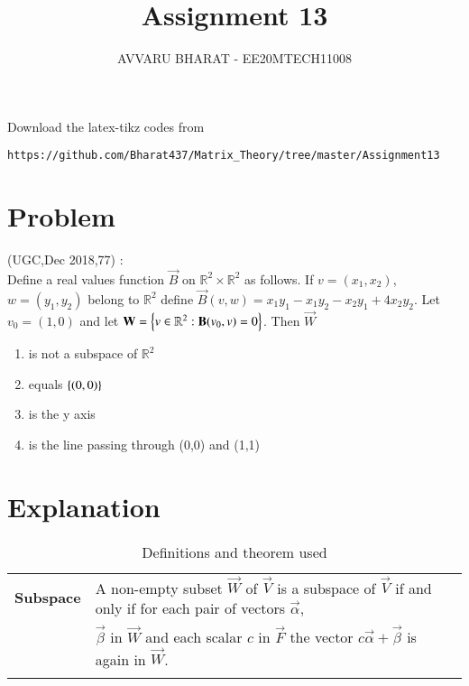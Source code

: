 \documentclass[journal,12pt]{IEEEtran}
\begin{document}
     \def\rightbox#1{\makebox[0in][r]{#1}}
     \def\centbox#1{\makebox[0in]{#1}}
     \def\topbox#1{\raisebox{-\baselineskip}[0in][0in]{#1}}
     \def\midbox#1{\raisebox{-0.5\baselineskip}[0in][0in]{#1}}
\vspace{3cm}
\title{Assignment 13}
\author{AVVARU BHARAT - EE20MTECH11008}
\maketitle
\bigskip
\renewcommand{\thefigure}{\theenumi}
\renewcommand{\thetable}{\theenumi}
%
Download the latex-tikz codes from 
%
\begin{lstlisting}
https://github.com/Bharat437/Matrix_Theory/tree/master/Assignment13
\end{lstlisting}
\section{\textbf{Problem}}
(UGC,Dec 2018,77) : \\
%
Define a real values function $\vec{B}$ on $\mathbb{R}^2\times\mathbb{R}^2$ as follows. If $v=(x_1,x_2)$, $w=(y_1,y_2)$ belong to $\mathbb{R}^2$ define $\vec{B}(v,w)=x_1y_1-x_1y_2-x_2y_1+4x_2y_2$. Let $v_0=(1,0)$ and let $\mathbf{W}=\left\{v\in\mathbb{R}^2:\mathbf{B}(v_0,v)=0\right\}$. Then $\vec{W}$
\begin{enumerate}
    \item is not a subspace of $\mathbb{R}^2$
    \item equals $\left\{(0,0)\right\}$
    \item is the y axis
    \item is the line passing through (0,0) and (1,1)
\end{enumerate}
\section{\textbf{Explanation}}
\renewcommand{\thetable}{1}
\begin{longtable}{|l|l|}
\hline
\endhead
\textbf{Subspace}&A non-empty subset $\vec{W}$ of $\vec{V}$ is a subspace of $\vec{V}$ if and only if for each pair of vectors $\vec{\alpha}$,\\& $\vec{\beta}$ in $\vec{W}$ and each scalar $c$ in $\vec{F}$ the vector $c\vec{\alpha}+\vec{\beta}$ is again in $\vec{W}$.\\
\hline
\caption{Definitions and theorem used}
\label{deftab}
\end{longtable}
\end{document}
